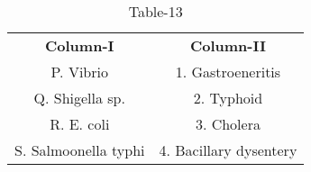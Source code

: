 \begin{table}[htbp]
  \centering
  \caption{Table-13}
  \label{tab:tables/table13.tex}
  \begin{tabular}{cc}
\textbf{Column-I} & \textbf{Column-II}\\

P. Vibrio & 1. Gastroeneritis \\
Q. Shigella sp. & 2. Typhoid \\
R. E. coli & 3. Cholera \\
S. Salmoonella typhi & 4. Bacillary dysentery \\
  
  
  
  \end{tabular}
\end{table}